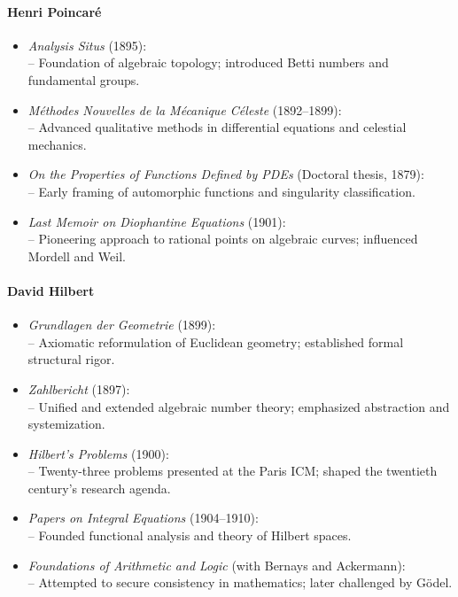 \documentclass[9pt]{article}
\begin{document}
\paragraph{Henri Poincaré}
\begin{itemize}
  \item \textit{Analysis Situs} (1895): \\
  \quad– Foundation of algebraic topology; introduced Betti numbers and fundamental groups.
  \item \textit{Méthodes Nouvelles de la Mécanique Céleste} (1892--1899): \\
  \quad– Advanced qualitative methods in differential equations and celestial mechanics.
  \item \textit{On the Properties of Functions Defined by PDEs} (Doctoral thesis, 1879): \\
  \quad– Early framing of automorphic functions and singularity classification.
  \item \textit{Last Memoir on Diophantine Equations} (1901): \\
  \quad– Pioneering approach to rational points on algebraic curves; influenced Mordell and Weil.
\end{itemize}

\paragraph{David Hilbert}
\begin{itemize}
  \item \textit{Grundlagen der Geometrie} (1899): \\
  \quad– Axiomatic reformulation of Euclidean geometry; established formal structural rigor.
  \item \textit{Zahlbericht} (1897): \\
  \quad– Unified and extended algebraic number theory; emphasized abstraction and systemization.
  \item \textit{Hilbert’s Problems} (1900): \\
  \quad– Twenty-three problems presented at the Paris ICM; shaped the twentieth century’s research agenda.
  \item \textit{Papers on Integral Equations} (1904--1910): \\
  \quad– Founded functional analysis and theory of Hilbert spaces.
  \item \textit{Foundations of Arithmetic and Logic} (with Bernays and Ackermann): \\
  \quad– Attempted to secure consistency in mathematics; later challenged by Gödel.
\end{itemize}
\end{document}
